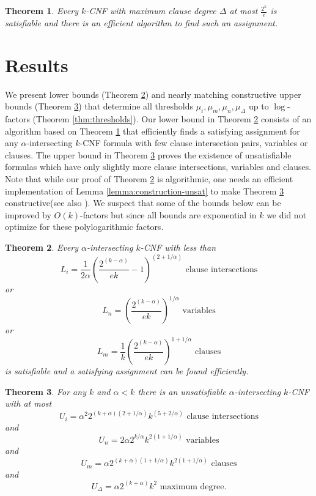 \documentclass[11pt,letterpaper]{article}
\newtheorem{theorem}{Theorem}
\begin{document}
\begin{theorem}\label{thm:lll}
Every $k$-CNF with maximum clause degree $\Delta$ at most $\frac{2^k}{e}$ is satisfiable and there is an efficient algorithm to find such an assignment.
\end{theorem}




\section{Results}

We present lower bounds (Theorem \ref{thm:lowerbound}) and nearly matching constructive upper bounds (Theorem \ref{thm:upperbound}) that determine all thresholds $\mu_i,\mu_m,\mu_n,\mu_\Delta$ up to $\log$-factors (Theorem \ref{thm:thresholds}). Our lower bound in Theorem \ref{thm:lowerbound} consists of an algorithm based on Theorem \ref{thm:lll} that efficiently finds a satisfying assignment for any $\alpha$-intersecting $k$-CNF formula with few clause intersection pairs, variables or clauses. The upper bound in Theorem \ref{thm:upperbound} proves the existence of unsatisfiable formulas which have only slightly more clause intersections, variables and clauses. Note that while our proof of Theorem \ref{thm:lowerbound} is algorithmic, one needs an efficient implementation of Lemma \ref{lemma:construction-unsat} to make Theorem \ref{thm:upperbound} constructive(see also \cite{Scheder10}). We suspect that some of the bounds below can be improved by $O(k)$-factors but since all bounds are exponential in $k$ we did not optimize for these polylogarithmic factors.


\begin{theorem}\label{thm:lowerbound}
Every $\alpha$-intersecting $k$-CNF with less than 
$$L_i = \frac{1}{2\alpha} \left(\frac{2^{(k-\alpha)}}{ek}-1\right)^{(2+1/\alpha)} \text{   clause intersections} $$ or
$$L_n =  \left(\frac{2^{(k-\alpha)}}{ek}\right)^{1/\alpha} \text{   variables}$$ or 
$$L_m = \frac{1}{k} \left(\frac{2^{(k-\alpha)}}{ek}\right)^{1+1/\alpha} \text{    clauses}$$ is satisfiable and a satisfying assignment can be found efficiently.
\end{theorem}

\medskip

\begin{theorem}\label{thm:upperbound}
For any $k$ and $\alpha < k$ there is an unsatisfiable $\alpha$-intersecting $k$-CNF with at most
$$U_i = \alpha^2 2^{(k+\alpha)(2+1/\alpha)} k^{(5+2/\alpha)}  \text{   clause intersections}$$
and 
$$U_n = 2\alpha 2^{k/\alpha} k^{2(1+1/\alpha)}   \text{   variables}$$
and
$$U_m = \alpha 2^{(k+\alpha)(1+1/\alpha)}{k^{2(1+1/\alpha)}} \text{    clauses}$$
and 
$$U_{\Delta} = \alpha 2^{(k+\alpha)}k^2 \text{   maximum degree}.$$
\end{theorem}
\end{document}
